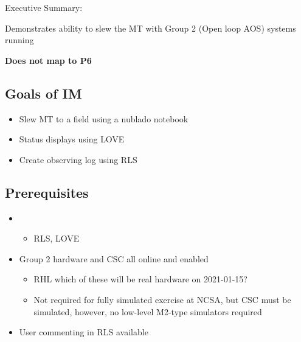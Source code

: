 
Executive Summary:

Demonstrates ability to slew the MT with Group 2 (Open loop AOS) systems running

\textbf{Does not map to P6}

\subsection{Goals of IM}
\begin{itemize}
\item Slew \gls{MT} to a field using a nublado notebook
\item Status displays using \gls{LOVE}
\item Create observing log using \gls{RLS}
\end{itemize}

\subsection{Prerequisites}
\begin{itemize}
\item{}
  \begin{itemize}
  \item \gls{RLS}, \gls{LOVE}
  \end{itemize}
\item{Group 2 hardware and \gls{CSC} all online and enabled}
  \begin{itemize}
  \item RHL which of these will be real hardware on 2021-01-15?
  \item Not required for fully simulated exercise at NCSA, but \gls{CSC} must be simulated,
    however, no low-level M2-type simulators required
  \end{itemize}
\item{User commenting in \gls{RLS} available}
\end{itemize}

